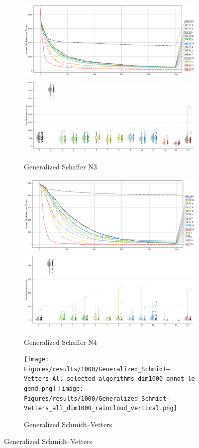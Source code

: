 \begin{figure}[p]\ContinuedFloat
\renewcommand\thesubfigure{C.\arabic{figure}.\arabic{subfigure}} %
    \centering

\begin{subfigure}{1\textwidth}
    \centering
    \includegraphics[width=.49\textwidth]{Figures/results/1000/Generalized_Schaffer_N3_All_selected_algorithms_dim1000_annot_legend.png}
    \includegraphics[width=.49\textwidth]{Figures/results/1000/Generalized_Schaffer_N3_all_dim1000_raincloud_vertical.png}
    \caption{Generalized Schaffer N3}
\end{subfigure}

\begin{subfigure}{1\textwidth}
    \centering
    \includegraphics[width=.49\textwidth]{Figures/results/1000/Generalized_Schaffer_N4_All_selected_algorithms_dim1000_annot_legend.png}
    \includegraphics[width=.49\textwidth]{Figures/results/1000/Generalized_Schaffer_N4_all_dim1000_raincloud_vertical.png}
    \caption{Generalized Schaffer N4}
\end{subfigure}

\begin{subfigure}{1\textwidth}
    \centering
    \texttt{[image: Figures/results/1000/Generalized\_Schmidt–Vetters\_All\_selected\_algorithms\_dim1000\_annot\_legend.png]}
    \texttt{[image: Figures/results/1000/Generalized\_Schmidt–Vetters\_all\_dim1000\_raincloud\_vertical.png]}
    \caption{Generalized Schmidt–Vetters}
\end{subfigure}


\end{figure}

